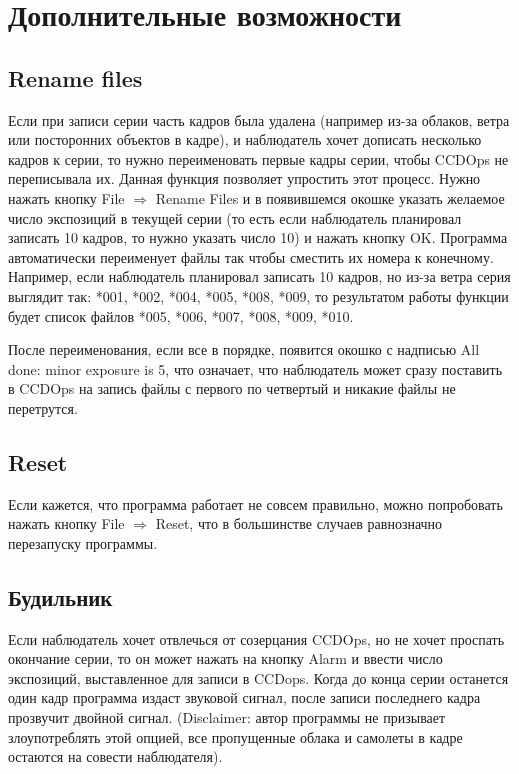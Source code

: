 \documentclass[a4paper,12pt,leqno,notitlepage]{article}
\begin{document}
\section{Дополнительные возможности}

\subsection{Rename files}
Если при записи серии часть кадров была удалена (например из-за облаков, ветра или посторонних
объектов в кадре), и наблюдатель хочет дописать несколько кадров к серии, то нужно переименовать
первые кадры серии, чтобы CCDOps не переписывала их. Данная функция позволяет упростить этот
процесс. Нужно нажать кнопку File $\Rightarrow$ Rename Files и в появившемся окошке указать
желаемое число экспозиций в текущей серии (то есть если наблюдатель планировал записать
10 кадров, то нужно указать число 10) и нажать кнопку OK. Программа автоматически переименует
файлы так чтобы сместить их номера к конечному. Например, если наблюдатель планировал записать
10 кадров, но из-за ветра серия выглядит так: *001, *002, *004, *005, *008, *009, то результатом
работы функции будет список файлов *005, *006, *007, *008, *009, *010.

После переименования, если все в порядке, появится окошко с надписью All done: minor exposure is 5,
что означает, что наблюдатель может сразу поставить в CCDOps на запись файлы с первого по четвертый
и никакие файлы не перетрутся.

\subsection{Reset}
Если кажется, что программа работает не совсем правильно, можно попробовать нажать кнопку
File $\Rightarrow$ Reset, что в большинстве случаев равнозначно перезапуску программы. 

\subsection{Будильник}
Если наблюдатель хочет отвлечься от созерцания CCDOps, но не хочет проспать окончание серии, то
он может нажать на кнопку Alarm и ввести число экспозиций, выставленное для записи в CCDops.
Когда до конца серии останется один кадр программа издаст звуковой сигнал, после записи последнего
кадра прозвучит двойной сигнал. (Disclaimer: автор программы не призывает злоупотреблять этой опцией,
все пропущенные облака и самолеты в кадре остаются на совести наблюдателя). 
\end{document}

